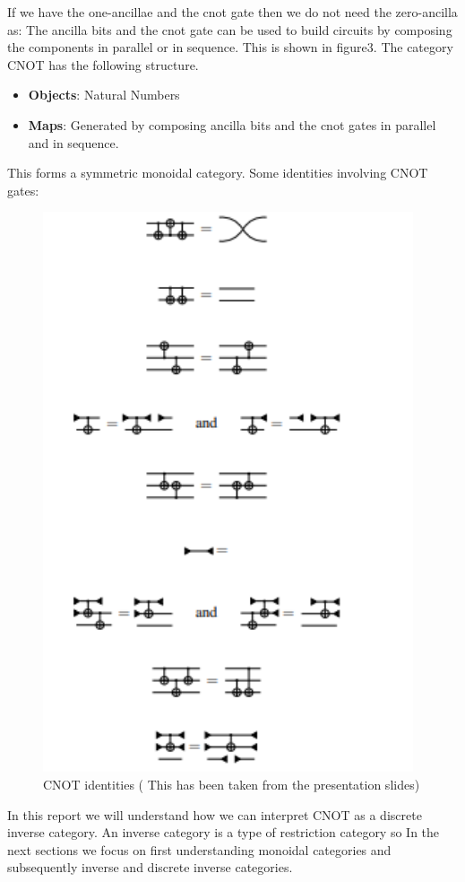 \documentclass[11pt, oneside]{amsart}
\theoremstyle{definition}
\theoremstyle{definition}
\begin{document}
If we have the one-ancillae and the cnot gate then we do not need the zero-ancilla as:
The ancilla bits and the cnot gate can be used to build circuits by composing the components in parallel or in sequence. This is shown in figure3.
The category CNOT has the following structure.
\begin{itemize}
    \item \textbf{Objects}: Natural Numbers
    \item \textbf{Maps}: Generated by composing ancilla bits and the cnot gates in parallel and in sequence.
\end{itemize}
This forms a symmetric monoidal category. Some identities involving CNOT gates:
\begin{figure}
 \includegraphics{Identities.pdf}
    \caption{CNOT identities ( This has been taken from the presentation slides)}
\end{figure}
In this report we will understand how we can interpret CNOT as a discrete inverse category.  An inverse category is a type of restriction category so In the next sections we focus on first understanding monoidal categories and subsequently inverse and discrete inverse categories.
\end{document}
